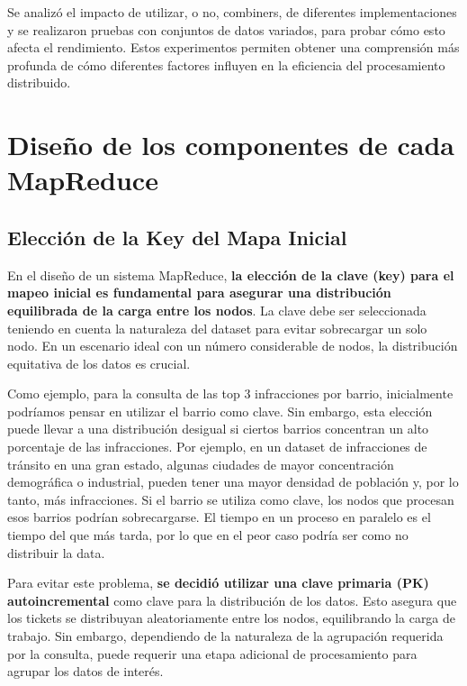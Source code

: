 \documentclass[a4paper,12pt]{article}
\begin{document}
	\bigskip
	
	Se analizó el impacto de utilizar, o no, combiners, de diferentes implementaciones y se realizaron pruebas con conjuntos de datos variados, para probar cómo esto afecta el rendimiento. Estos experimentos permiten obtener una comprensión más profunda de cómo diferentes factores influyen en la eficiencia del procesamiento distribuido.
	

	\newpage
	
	\section{Diseño de los componentes de cada MapReduce}
	
	\subsection{Elección de la Key del Mapa Inicial}
	
	En el diseño de un sistema MapReduce, \textbf{la elección de la clave (key) para el mapeo inicial es fundamental para asegurar una distribución equilibrada de la carga entre los nodos}. La clave debe ser seleccionada teniendo en cuenta la naturaleza del dataset para evitar sobrecargar un solo nodo. En un escenario ideal con un número considerable de nodos, la distribución equitativa de los datos es crucial.
	
	\bigskip 
	
	Como ejemplo, para la consulta de las top 3 infracciones por barrio, inicialmente podríamos pensar en utilizar el barrio como clave. Sin embargo, esta elección puede llevar a una distribución desigual si ciertos barrios concentran un alto porcentaje de las infracciones. Por ejemplo, en un dataset de infracciones de tránsito en una gran estado, algunas ciudades de mayor concentración demográfica o  industrial, pueden tener una mayor densidad de población y, por lo tanto, más infracciones. Si el barrio se utiliza como clave, los nodos que procesan esos barrios podrían sobrecargarse. El tiempo en un proceso en paralelo es el tiempo del que más tarda, por lo que en el peor caso podría ser como no distribuir la data.
	
	\bigskip
	
	Para evitar este problema, \textbf{se decidió utilizar una clave primaria (PK) autoincremental} como clave para la distribución de los datos. Esto asegura que los tickets se distribuyan aleatoriamente entre los nodos, equilibrando la carga de trabajo. Sin embargo, dependiendo de la naturaleza de la agrupación requerida por la consulta, puede requerir una etapa adicional de procesamiento para agrupar los datos de interés.
	
\end{document}
